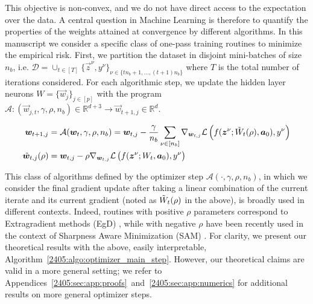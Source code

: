 This objective is non-convex, and we do not have direct access to the expectation over the data. A central question in Machine Learning is therefore to quantify the properties of the weights attained at convergence by different algorithms. In this manuscript we consider a specific class of one-pass training routines to minimize the empirical risk. First, we partition the dataset in disjoint mini-batches of size $n_b$, i.e. $\mathcal{D} = \cup_{t \in [T]}\{\vec z^\nu, y^\nu\}_{\nu \in \{tn_b+1, \dots, (t+1)n_b\}}$ where $T$ is the total number of iterations considered. For each algorithmic step, we update the hidden layer neurons $W=\{\vec w_j\}_{j \in [p]}$ with the program $\mathcal{A}: (\vec w_{j,t}, \gamma, \rho, n_b) \in \mathbb{R}^{d+3} \to \vec w_{t+1,j} \in \mathbb{R}^d$.
\begin{myalgorithm}
\label{2405:algo:optimizer_main_step}
 \begin{equation}
 \begin{aligned}
     {\boldsymbol{w}}_{t+1,j} & =  \mathcal{A}({\boldsymbol{w}}_t, \gamma, \rho, n_b) 
     =  {\boldsymbol{w}}_{t,j} - \frac{\gamma }{n_b}\sum_{\nu \in [n_b]
     }\nabla_{{\boldsymbol{w}}_{t,j}}
     \mathcal{L}
    \left(
    f ({\boldsymbol{z}}^\nu; 
    \Tilde{W}_t(\rho), {\boldsymbol{a}}_0 ),  y^\nu  \right) \\
   \Tilde{{\boldsymbol{w}}}_{t, j} (\rho) &= {\boldsymbol{w}}_{t, j} - \rho \nabla_{{\boldsymbol{w}}_{t,j}}
    \mathcal{L}\left( f({\boldsymbol{z}}^\nu; W_t, {\boldsymbol{a}}_0),  y^\nu \right)
 \end{aligned}
\label{2405:eq:algorithm}     
 \end{equation}
\end{myalgorithm}
This class of algorithms defined by the optimizer step $\mathcal{A}(\cdot , \gamma, \rho, n_b)$, in which we consider the final gradient update after taking a linear combination of the current iterate and its current gradient (noted as $\Tilde{W}_t(\rho)$ in the above), is broadly used in different contexts. Indeed, routines with positive $\rho$ parameters correspond to Extragradient methods (EgD) \citep{korpelevi1976extragradient}, while with negative $\rho$ have been recently used in the context of Sharpness Aware Minimization (SAM) \citep{foret2021sharpness}. For clarity, we present our theoretical results with the above, easily interpretable, Algorithm~\ref{2405:algo:optimizer_main_step}. However, our theoretical claims are valid in a more general setting; we refer to Appendices~\ref{2405:sec:app:proofs}~and~\ref{2405:sec:app:numerics} for additional results on more general optimizer steps. 

